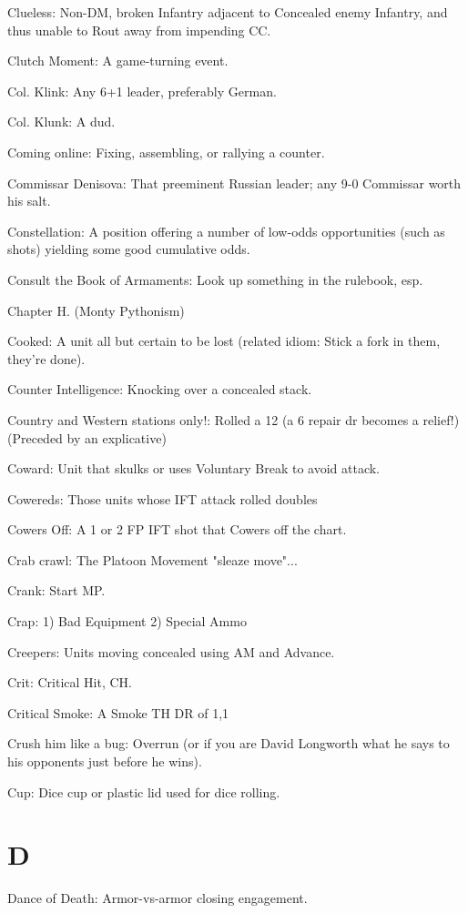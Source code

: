 \documentclass[letterpaper]{article}
\begin{document}
Clueless: Non-DM, broken Infantry adjacent to Concealed enemy Infantry, and thus unable to Rout away from impending CC.

Clutch Moment: A game-turning event.

Col. Klink:  Any 6+1 leader, preferably German.

Col. Klunk:  A dud.

Coming online: Fixing, assembling, or rallying a counter.

Commissar Denisova: That preeminent Russian leader; any 9-0 Commissar worth his salt.

Constellation: A position offering a number of low-odds opportunities (such as shots) yielding some good cumulative odds.

Consult the Book of Armaments: Look up something in the rulebook, esp.

Chapter H. (Monty Pythonism)

Cooked: A unit all but certain to be lost (related idiom: Stick a fork in them, they're done).

Counter Intelligence: Knocking over a concealed stack.

Country and Western stations only!: Rolled a 12 (a 6 repair dr becomes a relief!) (Preceded by an explicative)

Coward: Unit that skulks or uses Voluntary Break to avoid attack.

Cowereds: Those units whose IFT attack rolled doubles

Cowers Off: A 1 or 2 FP IFT shot that Cowers off the chart.

Crab crawl: The Platoon Movement "sleaze move"...

Crank: Start MP.

Crap: 1) Bad Equipment 2) Special Ammo

Creepers: Units moving concealed using AM and Advance.

Crit: Critical Hit, CH.

Critical Smoke: A Smoke TH DR of 1,1

Crush him like a bug: Overrun (or if you are David Longworth what he says to his opponents just before he wins).

Cup: Dice cup or plastic lid used for dice rolling.

\section{D}

Dance of Death: Armor-vs-armor closing engagement.
\end{document}
